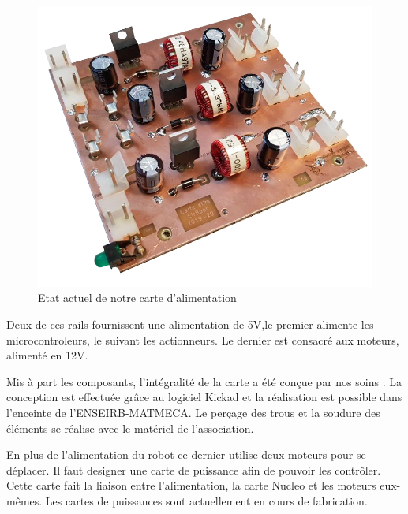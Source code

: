 \documentclass[a4paper,10pt]{article}
\begin{document}
\begin{spacing}{1.5}
\begin{figure}[H]
  \center
  \includegraphics[scale=0.3]{carte.png}
  \caption{Etat actuel de notre carte d'alimentation}
\end{figure}

Deux de ces rails fournissent une alimentation de 5V,le premier alimente les
microcontroleurs, le suivant les actionneurs. Le dernier est consacré aux moteurs,
alimenté en 12V.

Mis à part les composants, l'intégralité de la carte a été conçue par nos soins
. La conception est effectuée grâce au logiciel Kickad et la réalisation est
possible dans l'enceinte de l'ENSEIRB-MATMECA. Le perçage des trous et la soudure des éléments se réalise
avec le matériel de l'association.

En plus de l'alimentation du robot ce dernier utilise deux moteurs pour se
déplacer. Il faut designer une carte de puissance afin de pouvoir les contrôler.
Cette carte fait la liaison entre l'alimentation, la carte Nucleo et les moteurs
eux-mêmes. Les cartes de puissances sont actuellement en cours de fabrication.

\newpage

\end{spacing}
\end{document}
